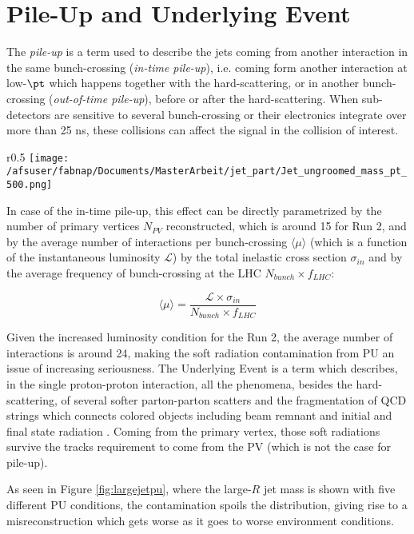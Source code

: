\section{Pile-Up and Underlying Event}
The \textit{pile-up} is a term used to describe the jets coming from another interaction in the same bunch-crossing (\textit{in-time pile-up}), i.e. coming form another interaction at low-$\pt$ which happens together with the hard-scattering, or in another bunch-crossing (\textit{out-of-time pile-up}), before or after the hard-scattering. When sub-detectors are sensitive to several bunch-crossing or their electronics integrate over more than 25 ns, these collisions can affect the signal in the collision of interest.

\begin{wrapfigure}{r}{0.5\textwidth}
  \centering
      \texttt{[image: /afsuser/fabnap/Documents/MasterArbeit/jet\_part/Jet\_ungroomed\_mass\_pt\_500.png]}
  \caption[Effect of pile-up contamination]{Effect of pile-up contamination in large-$R$ jets: here shown different PU conditions parametrized by $\langle\mu\rangle$. From \cite{highlumi}.}
  \label{fig:largejetpu}
\end{wrapfigure}


In case of the in-time pile-up, this effect can be directly parametrized by the number of primary vertices $N_{PV}$ reconstructed, which is around 15 for Run 2, and by the average number of interactions per bunch-crossing $\langle \mu \rangle$ (which is a function of the instantaneous luminosity $\mathcal{L}$) by the total inelastic cross section $\sigma_{in}$ and by the average frequency of bunch-crossing at the LHC $N_{bunch}\times f_{LHC}$:

$$\langle \mu \rangle = \frac{\mathcal{L}\times\sigma_{in}}{N_{bunch}\times f_{LHC}} $$

Given the increased luminosity condition for the Run 2, the average number of interactions is around 24, making the soft radiation contamination from PU an issue of increasing seriousness. 
The Underlying Event is a term which describes, in the single proton-proton interaction, all the phenomena, besides the hard-scattering, of several softer parton-parton scatters and the fragmentation of QCD strings which connects colored objects including beam remnant and initial and final state radiation \cite{ue}. Coming from the primary vertex, those soft radiations survive the tracks requirement to come from the PV (which is not the case for pile-up).

As seen in Figure \ref{fig:largejetpu}, where the large-$R$ jet mass is shown with five different PU conditions, the contamination spoils the distribution, giving rise to a misreconstruction which gets worse as it goes to worse environment conditions.\\

